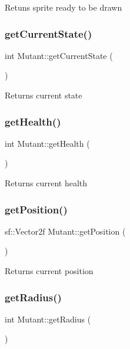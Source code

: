Retuns sprite ready to be drawn \mbox{\label{class_mutant_a07b88089382dcc84f261ee3d3d9a009b}} 
\subsubsection{\texorpdfstring{get\+Current\+State()}{getCurrentState()}}
{\footnotesize\ttfamily int Mutant\+::get\+Current\+State (\begin{DoxyParamCaption}{ }\end{DoxyParamCaption})}

Returns current state \mbox{\label{class_mutant_ae80452778ea58cf79ff76a1a481712af}} 
\subsubsection{\texorpdfstring{get\+Health()}{getHealth()}}
{\footnotesize\ttfamily int Mutant\+::get\+Health (\begin{DoxyParamCaption}{ }\end{DoxyParamCaption})}

Returns current health \mbox{\label{class_mutant_ab20f22800bae3c7587beb641248412ac}} 
\subsubsection{\texorpdfstring{get\+Position()}{getPosition()}}
{\footnotesize\ttfamily sf\+::\+Vector2f Mutant\+::get\+Position (\begin{DoxyParamCaption}{ }\end{DoxyParamCaption})}

Returns current position \mbox{\label{class_mutant_afb53c9562d5e98d5f6749024d09d132e}} 
\subsubsection{\texorpdfstring{get\+Radius()}{getRadius()}}
{\footnotesize\ttfamily int Mutant\+::get\+Radius (\begin{DoxyParamCaption}{ }\end{DoxyParamCaption})}

